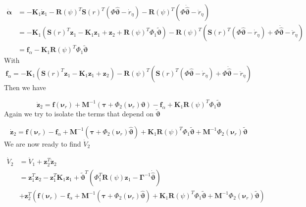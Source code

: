 \documentclass[12pt,a4]{article}
\begin{document}
\begin{align}
	\bm{\dot{\alpha}} & = -\bm{K}_1\bm{\dot{z}}_1 - \bm{R}(\psi)^T \bm{S}(r)^T (\Phi \bm{\hat{\vartheta}}  -  \dot{r}_\eta)
	- \bm{R}(\psi)^T(\Phi \bm{\dot{\hat{\vartheta}}}  -  \ddot{r}_\eta)                                                                            \\
	                  & =  -\bm{K}_1 \left( \bm{S}(r)^T\bm{z}_1 - \bm{K}_1\bm{z}_1 + \bm{z}_2 + \bm{R}(\psi)^T\Phi_1\bm{\tilde{\vartheta}} \right)
	- \bm{R}(\psi)^T \left( \bm{S}(r)^T  (\Phi \bm{\hat{\vartheta}}  -  \dot{r}_\eta) + \Phi \bm{\dot{\hat{\vartheta}}}  -  \ddot{r}_\eta  \right) \\
	                  & = \bm{f}_\alpha - \bm{K}_1\bm{R}(\psi)^T\Phi_1\bm{\tilde{\vartheta}}
\end{align}
With
\begin{equation}
	\bm{f}_\alpha = -\bm{K}_1 \left( \bm{S}(r)^T\bm{z}_1 - \bm{K}_1\bm{z}_1 + \bm{z}_2 \right)
	- \bm{R}(\psi)^T \left( \bm{S}(r)^T (\Phi \bm{\hat{\vartheta}}  -  \dot{r}_\eta) + \Phi \bm{\dot{\hat{\vartheta}}}  -  \ddot{r}_\eta  \right)
\end{equation}
Then we have

\begin{equation}
	\bm{\dot{z}}_2  = \bm{f}(\bm{\nu}_r) + \bm{M}^{-1}\left( \bm{\tau} + \Phi_2 (\bm{\nu}_r )\bm{\vartheta} \right)
	- \bm{f}_\alpha + \bm{K}_1\bm{R}(\psi)^T\Phi_1\bm{\tilde{\vartheta}}
\end{equation}
Again we try to isolate the terms that depend on $ \bm{\tilde{\vartheta}}$

\begin{equation}
	\bm{\dot{z}}_2 = \bm{f}(\bm{\nu}_r) - \bm{f}_\alpha
	+ \bm{M}^{-1}\left( \bm{\tau} + \Phi_2 (\bm{\nu}_r )\bm{\hat{\vartheta}} \right)
	+ \bm{K}_1\bm{R}(\psi)^T\Phi_1\bm{\tilde{\vartheta}}
	+ \bm{M}^{-1} \Phi_2 (\bm{\nu}_r )\bm{\tilde{\vartheta}}
\end{equation}
We are now ready to find $\dot{V}_2$


\begin{align}
	\dot{V}_2 & = \dot{V}_1 + \bm{z}_2^T\dot{\bm{z}}_2                                                                  \\
	          & = \bm{z}_1^T \bm{z}_2 -\bm{z}_1^T\bm{K}_1\bm{z}_1
	+ \bm{\tilde{\vartheta}} ^T \left( \Phi_1^T\bm{R}(\psi)\bm{z}_1 - \bm{\Gamma}^{-1}\bm{\dot{\hat{\vartheta}}}	\right) \\
	          & + \bm{z}_2^T \left(	  \bm{f}(\bm{\nu}_r) - \bm{f}_\alpha
	+ \bm{M}^{-1}\left( \bm{\tau} + \Phi_2 (\bm{\nu}_r )\bm{\hat{\vartheta}} \right)
	+ \bm{K}_1\bm{R}(\psi)^T\Phi_1\bm{\tilde{\vartheta}}
	+ \bm{M}^{-1} \Phi_2 (\bm{\nu}_r )\bm{\tilde{\vartheta}}	\right)
\end{align}
\end{document}

